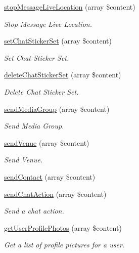 \begin{DoxyCompactItemize}
\hyperlink{class_telegram_adfd20888f1d4e6e4306343a45e4b4687}{stop\-Message\-Live\-Location} (array \$content)
\begin{DoxyCompactList}\small\item\em Stop Message Live Location. \end{DoxyCompactList}\item 
\hyperlink{class_telegram_a4a9940630e885df9aafdb898859c26cd}{set\-Chat\-Sticker\-Set} (array \$content)
\begin{DoxyCompactList}\small\item\em Set Chat Sticker Set. \end{DoxyCompactList}\item 
\hyperlink{class_telegram_aefe258391c6678068ec786124d87428b}{delete\-Chat\-Sticker\-Set} (array \$content)
\begin{DoxyCompactList}\small\item\em Delete Chat Sticker Set. \end{DoxyCompactList}\item 
\hyperlink{class_telegram_a227968146a427290d58b96925f257078}{send\-Media\-Group} (array \$content)
\begin{DoxyCompactList}\small\item\em Send Media Group. \end{DoxyCompactList}\item 
\hyperlink{class_telegram_a4ad657480e7bc9575a71912eb85c92d5}{send\-Venue} (array \$content)
\begin{DoxyCompactList}\small\item\em Send Venue. \end{DoxyCompactList}\item 
\hyperlink{class_telegram_a5ba4fd675a877d995bb0d7305aa56324}{send\-Contact} (array \$content)
\item 
\hyperlink{class_telegram_aa8c4c54f8f2fcbb53de050458fb176b7}{send\-Chat\-Action} (array \$content)
\begin{DoxyCompactList}\small\item\em Send a chat action. \end{DoxyCompactList}\item 
\hyperlink{class_telegram_af2245dc488830eb7add02c35e8dcf492}{get\-User\-Profile\-Photos} (array \$content)
\begin{DoxyCompactList}\small\item\em Get a list of profile pictures for a user. \end{DoxyCompactList}\item 

\end{DoxyCompactItemize}
